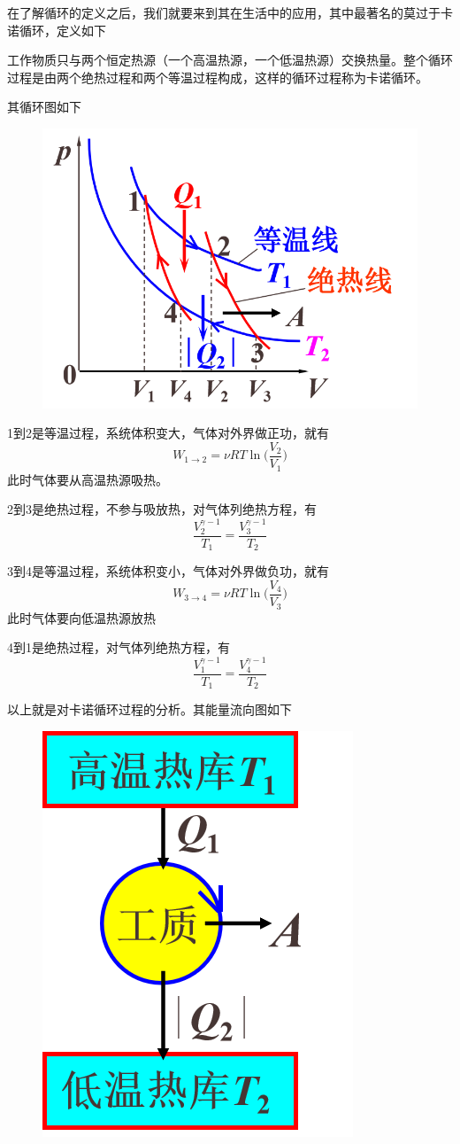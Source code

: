 \documentclass[lang=cn,10pt]{elegantbook}
\begin{document}
	在了解循环的定义之后，我们就要来到其在生活中的应用，其中最著名的莫过于卡诺循环，定义如下
	\begin{definition}[卡诺循环]
		工作物质只与两个恒定热源（一个高温热源，一个低温热源）交换热量。整个循环过程是由两个绝热过程和两个等温过程构成，这样的循环过程称为卡诺循环。
	\end{definition}
	其循环图如下
	\begin{figure}[H]
		\centering
		\includegraphics[width=0.4\linewidth]{screenshot010}
		\caption{}
		\label{fig:screenshot010}
	\end{figure}
	1到2是等温过程，系统体积变大，气体对外界做正功，就有
	\begin{equation*}
		W_{1\rightarrow 2}=\nu RT\ln\mathrm{(}\frac{V_2}{V_1})
	\end{equation*}
	此时气体要从高温热源吸热。
	
	2到3是绝热过程，不参与吸放热，对气体列绝热方程，有
	\begin{equation*}
		\frac{V_{2}^{\gamma-1}}{T_{1}}=\frac{V_{3}^{\gamma-1}}{T_{2}}
	\end{equation*}
	
	3到4是等温过程，系统体积变小，气体对外界做负功，就有
	\begin{equation*}
		W_{3\rightarrow 4}=\nu RT\ln\mathrm{(}\frac{V_4}{V_3})
	\end{equation*}
	此时气体要向低温热源放热
	
	4到1是绝热过程，对气体列绝热方程，有
	\begin{equation*}
		\frac{V_{1}^{\gamma-1}}{T_{1}}=\frac{V_{4}^{\gamma-1}}{T_{2}}
	\end{equation*}
	
	以上就是对卡诺循环过程的分析。其能量流向图如下
	\begin{figure}[H]
		\centering
		\includegraphics[width=0.3\linewidth]{screenshot011}
		\caption{}
		\label{fig:screenshot011}
	\end{figure}
	
\end{document}
